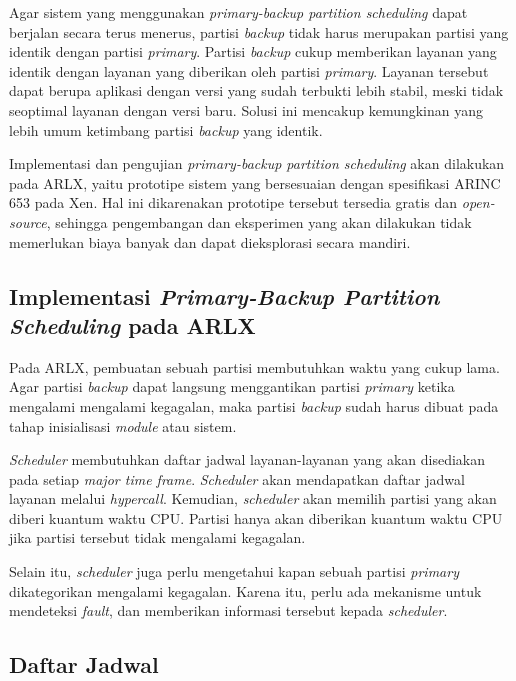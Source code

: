 Agar sistem yang menggunakan \textit{primary-backup partition scheduling} dapat berjalan secara
terus menerus, partisi \textit{backup} tidak harus merupakan partisi yang identik dengan partisi
\textit{primary}. Partisi \textit{backup} cukup memberikan layanan yang identik dengan layanan
yang diberikan oleh partisi \textit{primary}. Layanan tersebut dapat berupa aplikasi dengan
versi yang sudah terbukti lebih stabil, meski tidak seoptimal layanan dengan versi baru. Solusi
ini mencakup kemungkinan yang lebih umum ketimbang partisi \textit{backup} yang identik.

Implementasi dan pengujian \textit{primary-backup partition scheduling} akan dilakukan pada
ARLX, yaitu prototipe sistem yang bersesuaian dengan spesifikasi ARINC 653 pada Xen. Hal ini
dikarenakan prototipe tersebut tersedia gratis dan \textit{open-source}, sehingga pengembangan
dan eksperimen yang akan dilakukan tidak memerlukan biaya banyak dan dapat dieksplorasi secara
mandiri.

\subsection{Implementasi \textit{Primary-Backup Partition Scheduling} pada ARLX}

Pada ARLX, pembuatan sebuah partisi membutuhkan waktu yang cukup lama. Agar partisi
\textit{backup} dapat langsung menggantikan partisi \textit{primary} ketika mengalami mengalami
kegagalan, maka partisi \textit{backup} sudah harus dibuat pada tahap inisialisasi
\textit{module} atau sistem.

\textit{Scheduler} membutuhkan daftar jadwal layanan-layanan yang akan disediakan pada setiap
\textit{major time frame}. \textit{Scheduler} akan mendapatkan daftar jadwal layanan melalui
\textit{hypercall}. Kemudian, \textit{scheduler} akan memilih partisi yang akan diberi kuantum
waktu CPU. Partisi hanya akan diberikan kuantum waktu CPU jika partisi tersebut tidak mengalami
kegagalan.

Selain itu, \textit{scheduler} juga perlu mengetahui kapan sebuah partisi \textit{primary}
dikategorikan mengalami kegagalan. Karena itu, perlu ada mekanisme untuk mendeteksi
\textit{fault}, dan memberikan informasi tersebut kepada \textit{scheduler}.

\subsection{Daftar Jadwal}
\label{section:daftar_jadwal}


